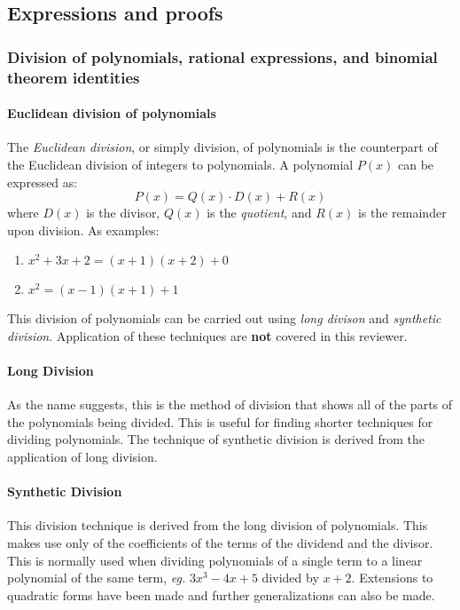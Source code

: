 \subsection{Expressions and proofs}

\subsubsection{Division of polynomials, rational expressions, and binomial theorem identities}
\paragraph{Euclidean division of polynomials}
The \emph{Euclidean division}, or simply division, of polynomials is the counterpart of the Euclidean division of integers to polynomials.
A polynomial $P(x)$ can be expressed as:
$$P(x) = Q(x)\cdot D(x) + R(x)$$
where $D(x)$ is the divisor, $Q(x)$ is the \emph{quotient}, and $R(x)$ is the remainder upon division.
As examples:
\begin{enumerate}
  \item $x^2+3x+2 = (x+1)(x+2) + 0$
  \item $x^2 = (x-1)(x+1) + 1$
\end{enumerate}

This division of polynomials can be carried out using \emph{long divison} and \emph{synthetic division}.
Application of these techniques are \textbf{not} covered in this reviewer.

\paragraph{Long Division}
As the name suggests, this is the method of division that shows all of the parts of the polynomials being divided.
This is useful for finding shorter techniques for dividing polynomials.
The technique of synthetic division is derived from the application of long division.

\paragraph{Synthetic Division}
This division technique is derived from the long division of polynomials.
This makes use only of the coefficients of the terms of the dividend and the divisor.
This is normally used when dividing polynomials of a single term to a linear polynomial of the same term, \textit{eg.} $3x^3 - 4x + 5$ divided by $x+2$.
Extensions to quadratic forms have been made and further generalizations can also be made.

